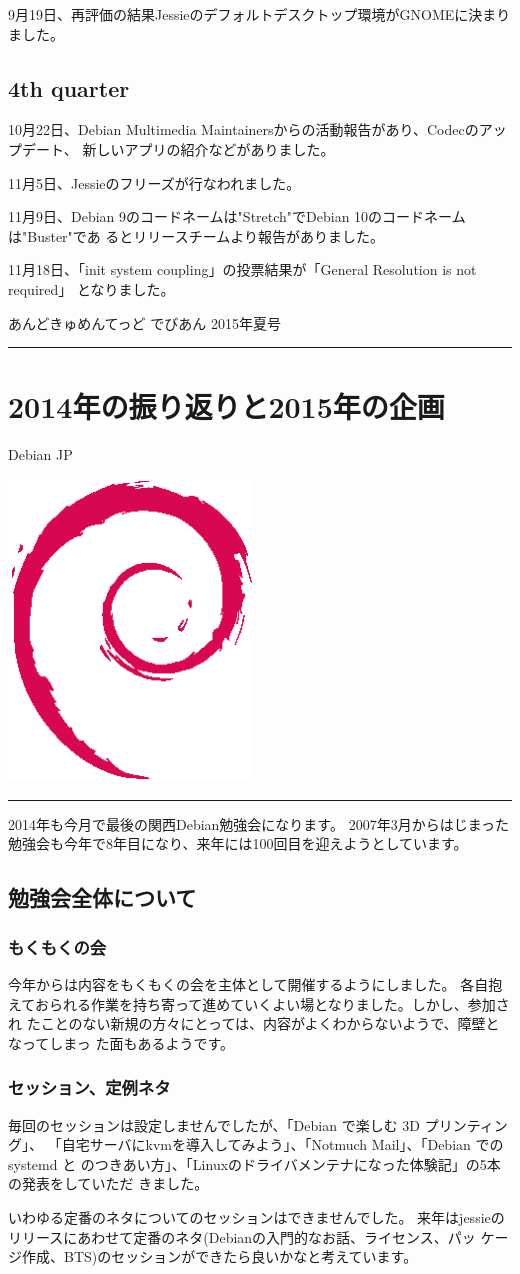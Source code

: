 \documentclass[mingoth,a4paper]{jsarticle}
\renewcommand{\dancersection}[2]{%
\newpage
あんどきゅめんてっど でびあん 2015年夏号
%
\vspace{0.1mm}\\
{\color{dancerdarkblue}\rule{\hsize}{2mm}}

%
%
\begin{minipage}[t]{0.6\hsize}
\color{dancerdarkblue}
\vspace{1cm}
\section{#1}
\hfill{}#2\\
\end{minipage}
\begin{minipage}[t]{0.4\hsize}
\vspace{-2cm}
\hfill{}\includegraphics[height=8cm]{image200502/openlogo-nd.eps}\\
\vspace{-5cm}
\end{minipage}
%
{\color{dancerlightblue}\rule{0.66\hsize}{2mm}}
%
\vspace{2cm}
}
\begin{document}
9月19日、再評価の結果Jessieのデフォルトデスクトップ環境がGNOMEに決まりました。

\subsection{4th quarter}

10月22日、Debian Multimedia Maintainersからの活動報告があり、Codecのアップデート、
新しいアプリの紹介などがありました。

11月5日、Jessieのフリーズが行なわれました。

11月9日、Debian 9のコードネームは"Stretch"でDebian 10のコードネームは"Buster"であ
るとリリースチームより報告がありました。

11月18日、「init system coupling」の投票結果が「General Resolution is not required」
となりました。

\dancersection{2014年の振り返りと2015年の企画}{Debian JP}

2014年も今月で最後の関西Debian勉強会になります。
2007年3月からはじまった勉強会も今年で8年目になり、来年には100回目を迎えようとしています。

\subsection{勉強会全体について}

\subsubsection{もくもくの会}

今年からは内容をもくもくの会を主体として開催するようにしました。
各自抱えておられる作業を持ち寄って進めていくよい場となりました。しかし、参加され
たことのない新規の方々にとっては、内容がよくわからないようで、障壁となってしまっ
た面もあるようです。

\subsubsection{セッション、定例ネタ}

毎回のセッションは設定しませんでしたが、「Debian で楽しむ 3D プリンティング」、
「自宅サーバにkvmを導入してみよう」、「Notmuch Mail」、「Debian での systemd と
  のつきあい方」、「Linuxのドライバメンテナになった体験記」の5本の発表をしていただ
きました。

いわゆる定番のネタについてのセッションはできませんでした。
来年はjessieのリリースにあわせて定番のネタ(Debianの入門的なお話、ライセンス、パッ
ケージ作成、BTS)のセッションができたら良いかなと考えています。
\end{document}
